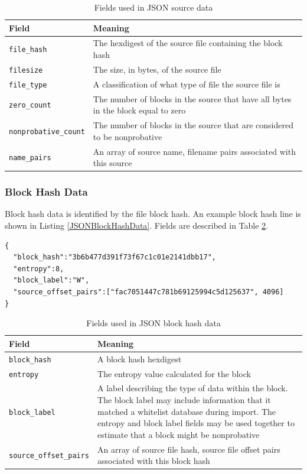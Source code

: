 \documentclass[11pt,fleqn]{article} %
\begin{document}
\begin{table}[!ht]

\centering
\caption{Fields used in JSON source data}
\label{tab:JSONSourceData}
\begin{tabular}{|p{5 cm}|p{8.8 cm}|}
\hline \hline
\textbf{Field} & \textbf{Meaning} \\
\hline
\verb+file_hash+ & The hexdigest of the source file containing the block hash\\
\hline
\verb+filesize+ & The size, in bytes, of the source file\\
\hline
\verb+file_type+ & A classification of what type of file the source file is\\
\hline
\verb+zero_count+ & The number of blocks in the source that have all bytes in the block equal to zero\\
\hline
\verb+nonprobative_count+ & The number of blocks in the source that are considered to be nonprobative\\
\hline
\verb+name_pairs+ & An array of source name, filename pairs associated with this source\\
\hline
\end{tabular}
\end{table}

\subsubsection{Block Hash Data}
Block hash data is identified by the file block hash.  An example block hash line is shown in Listing \ref{JSONBlockHashData}. Fields are described in Table \ref{tab:JSONBlockHashData}.\\

\lstset{style=customfile}
\begin{lstlisting}[float, caption={Example JSON block hash data used during import/export}, label=JSONBlockHashData]
{
  "block_hash":"3b6b477d391f73f67c1c01e2141dbb17",
  "entropy":8,
  "block_label":"W",
  "source_offset_pairs":["fac7051447c781b69125994c5d125637", 4096]
}
\end{lstlisting}

\begin{table}[!ht]

\centering
\caption{Fields used in JSON block hash data}
\label{tab:JSONBlockHashData}
\begin{tabular}{|p{5 cm}|p{8.8 cm}|}
\hline \hline
\textbf{Field} & \textbf{Meaning} \\
\hline
\verb+block_hash+ & A block hash hexdigest\\
\hline
\verb+entropy+ & The entropy value calculated for the block\\
\hline
\verb+block_label+ & A label describing the type of data within the block. The block label may include information that it matched a whitelist database during import. The entropy and block label fields may be used together to estimate that a block might be nonprobative\\
\hline
\verb+source_offset_pairs+ & An array of source file hash, source file offset pairs associated with this block hash\\
\hline
\end{tabular}
\end{table}
\end{document}
